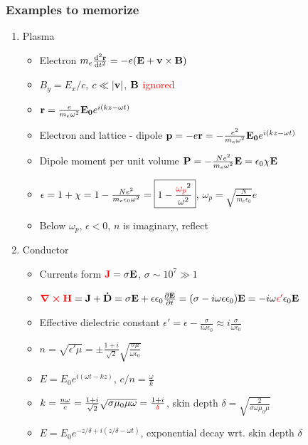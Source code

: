\documentclass{article}
\theoremstyle{remark}
\begin{document}
\subsubsection*{Examples to memorize}
\begin{enumerate}
    \item Plasma\begin{itemize}
        \item Electron $m_e\dv[2]{\vb{r}}{t}=-e(\vb{E}+\vb{v}\times\vb{B})$
        \item $B_y=E_x/c$, $c\ll|\vb{v}|$, $\vb{B}$ \textcolor{red}{ignored}
        \item $\vb{r}=\frac{e}{m_e\omega^2}\vb{E_0}e^{i(kz-\omega t)}$
        \item Electron and lattice - dipole $\vb{p}=-e\vb{r}=-\frac{e^2}{m_e\omega^2}\vb{E_0}e^{i(kz-\omega t)}$
        \item Dipole moment per unit volume $\vb{P}=-\frac{Ne^2}{m_e\omega^2}\vb{E}=\epsilon_0\chi\vb{E}$
        \item $\epsilon=1+\chi=1-\frac{Ne^2}{m_e\epsilon_0\omega^2}=\boxed{1-\frac{\textcolor{red}{\omega_p}^2}{\omega^2}}$, $\omega_p=\sqrt{\frac{N}{m_e\epsilon_0}}e$
        \item Below $\omega_p$, $\epsilon<0$, $n$ is imaginary, reflect
    \end{itemize}
    \item Conductor\begin{itemize}
        \item Currents form $\textcolor{red}{\vb{J}}=\sigma\vb{E}$, $\sigma\sim10^7\gg1$
        \item $\textcolor{red}{\curl\vb{H}}=\vb{J}+\vb{\dot D}=\sigma\vb{E}+\epsilon\epsilon_0\pdv{\vb{E}}{t}=(\sigma-i\omega\epsilon\epsilon_0)\vb{E}=-i\omega\textcolor{red}{\epsilon'}\epsilon_0\vb{E}$
        \item Effective dielectric constant $\epsilon'=\epsilon-\frac{\sigma}{i\omega\epsilon_0}\approx \boxed{i\frac{\sigma}{\omega\epsilon_0}}$
        \item $n=\sqrt{\epsilon'\mu}=\pm\frac{1+i}{\sqrt{2}}\sqrt{\frac{\sigma\mu}{\omega\epsilon_0}}$
        \item $E=E_0e^{i(\omega t-kz)}$, $c/n=\frac{\omega}{k}$
        \item $k=\frac{n\omega}{c}=\frac{1+i}{\sqrt{2}}\sqrt{\sigma\mu_0\mu\omega}=\frac{1+i}{\textcolor{red}{\delta}}$, skin depth $\boxed{\delta=\sqrt{\frac{2}{\sigma\omega\mu_0\mu}}}$
        \item $E=E_0e^{-z/\delta+i(z/\delta-\omega t)}$, exponential decay wrt. skin depth $\delta$

\end{itemize}
\end{enumerate}
\end{document}
